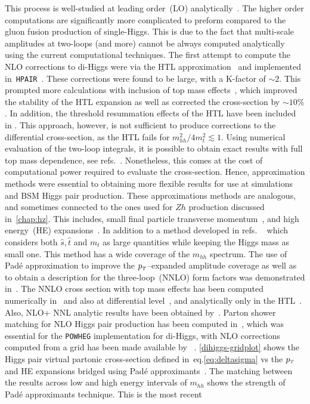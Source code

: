 This process is well-studied at leading order~(LO) analytically~\cite{EBOLI1987269,GLOVER1988282,DICUS1988457,Plehn:1996wb}.  The higher order computations are significantly more complicated to preform compared to the gluon fusion production of single-Higgs. This is due to the fact that multi-scale amplitudes at two-loops (and more) cannot be always computed analytically using the current computational techniques.  The first attempt to compute the NLO corrections to di-Higgs were via the HTL approximation~\cite{Dawson:1998py, Altenkamp:2012sx,Grigo:2014jma} and implemented in~\texttt{HPAIR}~\cite{Plehn:1996wb}. These corrections were found to be large, with a K-factor of $ \sim 2$.  This prompted more calculations with inclusion of top mass effects~\cite{deFlorian:2013uza,Grigo:2013rya,Maltoni:2014eza,Grigo:2015dia,Degrassi:2016vss}, which improved the stability of the HTL expansion as well as corrected the cross-section by $\sim 10\%$. In addition, the threshold resummation effects of the HTL have been included in \cite{Shao:2013bz}. This approach, however, is not sufficient to produce corrections to the differential cross-section, as the HTL fails for $m_{hh}^2/4m_t^2 \lesssim 1$. Using numerical evaluation of the two-loop integrals, it is possible to obtain exact results with full top mass dependence, see refs.~\cite{Borowka:2016ypz,Borowka:2016ehy,Baglio:2018lrj}. Nonetheless, this comes at the cost of computational power required to evaluate the cross-section.  Hence, approximation methods were essential to obtaining more flexible results for use at simulations and BSM Higgs pair production.  These approximations methods are analogous, and sometimes connected  to the ones used for $Zh$ production discussed in~\autoref{chap:hz}. This includes, small final particle transverse momentum~\cite{Bonciani:2018omm}, and high energy~(HE) expansions~\cite{Davies:2018ood}. In addition to a method developed in refs. ~\cite{Xu:2018eos,Wang:2020nnr} which considers both $\hat s , \hat t$ and $m_t$ as large quantities while keeping the Higgs mass as small one. This method has a wide coverage of the $m_{hh}$ spectrum.  The use of Pad\'e approximation to improve the $p_{\scriptscriptstyle T}$--expanded amplitude coverage as well as to obtain a description for the three-loop~(NNLO) form factors was demonstrated in~\cite{Davies:2019nhm}. The NNLO cross section with top mass effects has been computed numerically in~\cite{Grazzini:2018bsd} and also at differential level~\cite{deFlorian:2016uhr}, and analytically only in the HTL~\cite{deFlorian:2013jea}. Also, NLO+ NNL analytic results have been obtained by~\cite{deFlorian:2015moa}. Parton shower matching for NLO Higgs pair production has been computed  in~\cite{Jones:2017giv,Heinrich:2019bkc}, which was essential for the \texttt{POWHEG} implementation for di-Higgs, with NLO corrections computed from a grid has been made available by ~\cite{Heinrich:2017kxx,Heinrich:2019bkc,Heinrich:2020ckp}. \autoref{dihiggs-gridplot} shows the Higgs pair virtual partonic cross-section defined in~eq.\eqref{eq:deltasigma} vs the  $p_{\scriptscriptstyle T}$ and HE expansions bridged using Pad\'e  approximants~\cite{Bellafronte:2022jmo}.  The matching between the results across low and high energy intervals of $m_{hh}$ shows the strength of Pad\'e  approximants technique.  This is the most recent 